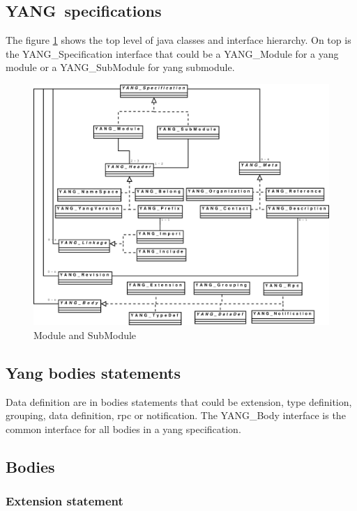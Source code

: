 \documentclass[a4paper]{article}
\newcommand{\y}{YANG}
\begin{document}
\subsection{\y\ specifications}

The  figure  \ref{spec}  shows  the  top level  of  java  classes  and
interface hierarchy.  On top is the  YANG\_Specification interface that
could be a YANG\_Module for a  yang module or a YANG\_SubModule for yang
submodule.

\begin{figure}[htbp]
\begin{center}
\includegraphics[scale = .3]{yspec.eps}
\end{center}
\caption{Module and SubModule}
\label{spec}
\end{figure}

\subsection{Yang bodies statements}

Data definition are in bodies statements that could be extension, type
definition,  grouping,  data  definition,  rpc  or  notification.  The
YANG\_Body interface is the common  interface for all bodies in a yang
specification.

\subsection{Bodies}

\subsubsection{Extension statement}
\label{extension:section:global}
\end{document}
